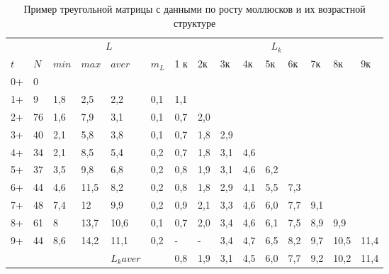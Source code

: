 \begin{table}[p]
        \caption{Пример треугольной матрицы с данными по росту моллюсков и их возрастной структуре}
        \label{tab:rost_matrica_primer}
        \begin{tabularx}{\textwidth}{|X|X|XX|XX|XXXXXXXXX|}
        \hline
        &    & \multicolumn{4}{c|}{$L$}               & \multicolumn{9}{c|}{$L_{k}$} \\ 
        $t$     & $N$  & $min$ & $max$ & $aver$ & $m_{L}$   & 1 к & 2к  & 3к  & 4к  & 5к  & 6к  & 7к  & 8к   & 9к   \\ \hline
        0+      & 0  &       &       &         &         &     &     &     &     &     &     &     &      &      \\
        1+      & 9  & 1,8   & 2,5   & 2,2     & 0,1     & 1,1 &     &     &     &     &     &     &      &      \\
        2+      & 76 & 1,6   & 7,9   & 3,1     & 0,1     &\cellcolor{yellow}0,7 & \cellcolor{yellow}2,0 &     &     &     &     &     &      &      \\
        3+      & 40 & 2,1   & 5,8   & 3,8     & 0,1     & 0,7 & 1,8 & 2,9 &     &     &     &     &      &      \\
        4+      & 34 & 2,1   & 8,5   & 5,4     & 0,2     & 0,7 & 1,8 & 3,1 & 4,6 &     &     &     &      &      \\
        5+      & 37 & 3,5   & 9,8   & 6,8     & 0,2     & 0,8 & 1,9 & 3,1 & 4,6 & 6,2 &     &     &      &      \\
        6+      & 44 & 4,6   & 11,5  & 8,2     & 0,2     & 0,8 & 1,8 & 2,9 & 4,1 & 5,5 & 7,3 &     &      &      \\
        7+      & 48 & 7,4   & 12    & 9,9     & 0,2     & 0,9 & 2,1 & 3,3 & 4,6 & 6,0 & 7,7 & 9,1 &      &      \\
        8+      & 61 & 8     & 13,7  & 10,6    & 0,1     & \cellcolor{red}0,7 & \cellcolor{red}2,0 & \cellcolor{red}3,4 & \cellcolor{red}4,6 & \cellcolor{red}6,1 & \cellcolor{red}7,5 & \cellcolor{red}8,9 & \cellcolor{red}9,9  &      \\
        9+      & 44 & 8,6   & 14,2  & 11,1    & 0,2     & -   & -   & 3,4 & 4,7 & 6,5 & 8,2 & 9,7 & 10,5 & 11,4 \\ \hline
                &    &       &       & $L_{k} aver$  &  & \cellcolor{blue}0,8 & \cellcolor{blue}1,9 & \cellcolor{blue}3,1 & \cellcolor{blue}4,5 & \cellcolor{blue}6,0 & \cellcolor{blue}7,7 & \cellcolor{blue}9,2 & \cellcolor{blue}10,2 & \cellcolor{blue}11,4 \\

\end{tabularx}
\end{table}
